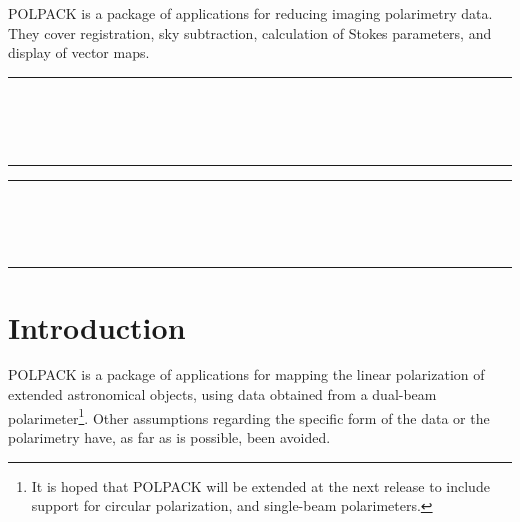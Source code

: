 POLPACK is a package of applications for reducing imaging polarimetry data. 
They cover registration, sky subtraction, calculation of Stokes
parameters, and display of vector maps.

 \begin{latexonly}
   \newpage
   \markright{\stardocname}
   \null\vspace{5mm}
   \begin {center}
   \rule{80mm}{0.5mm} \\ [1ex]
   {\Large\bf \stardoctitle \\ [2.5ex]
    \normalsize \stardocversion} \\ [2ex]
   \rule{80mm}{0.5mm}
   \end{center}
   \setlength{\parskip}{0mm}
   \latexonlytoc
   \setlength{\parskip}{\medskipamount}
 \end{latexonly}
\newpage
\renewcommand{\thepage}{\arabic{page}}
\setcounter{page}{1}
\begin{latexonly}
  \begin {center}
     \rule{80mm}{0.5mm} \\ [1ex]
     {\Large\bf   \stardoctitle \\ [2.5ex]
      \normalsize \stardocversion} \\ [2ex]
    \rule{80mm}{0.5mm}
  \end{center}
\end{latexonly}

\section{Introduction}
POLPACK is a package of applications for mapping the linear polarization
of extended astronomical objects, using data obtained from a dual-beam
polarimeter\footnote{It is hoped that POLPACK will be extended at the
next release to include support for circular polarization, and
single-beam polarimeters.}. Other assumptions regarding the specific form
of the data or the polarimetry have, as far as is possible, been avoided.

